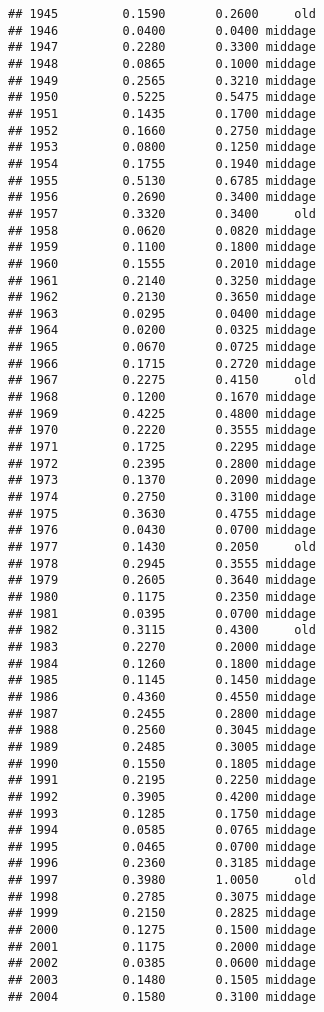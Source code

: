 \documentclass[
]{article}
\begin{document}
\begin{verbatim}
## 1945         0.1590       0.2600     old
## 1946         0.0400       0.0400 middage
## 1947         0.2280       0.3300 middage
## 1948         0.0865       0.1000 middage
## 1949         0.2565       0.3210 middage
## 1950         0.5225       0.5475 middage
## 1951         0.1435       0.1700 middage
## 1952         0.1660       0.2750 middage
## 1953         0.0800       0.1250 middage
## 1954         0.1755       0.1940 middage
## 1955         0.5130       0.6785 middage
## 1956         0.2690       0.3400 middage
## 1957         0.3320       0.3400     old
## 1958         0.0620       0.0820 middage
## 1959         0.1100       0.1800 middage
## 1960         0.1555       0.2010 middage
## 1961         0.2140       0.3250 middage
## 1962         0.2130       0.3650 middage
## 1963         0.0295       0.0400 middage
## 1964         0.0200       0.0325 middage
## 1965         0.0670       0.0725 middage
## 1966         0.1715       0.2720 middage
## 1967         0.2275       0.4150     old
## 1968         0.1200       0.1670 middage
## 1969         0.4225       0.4800 middage
## 1970         0.2220       0.3555 middage
## 1971         0.1725       0.2295 middage
## 1972         0.2395       0.2800 middage
## 1973         0.1370       0.2090 middage
## 1974         0.2750       0.3100 middage
## 1975         0.3630       0.4755 middage
## 1976         0.0430       0.0700 middage
## 1977         0.1430       0.2050     old
## 1978         0.2945       0.3555 middage
## 1979         0.2605       0.3640 middage
## 1980         0.1175       0.2350 middage
## 1981         0.0395       0.0700 middage
## 1982         0.3115       0.4300     old
## 1983         0.2270       0.2000 middage
## 1984         0.1260       0.1800 middage
## 1985         0.1145       0.1450 middage
## 1986         0.4360       0.4550 middage
## 1987         0.2455       0.2800 middage
## 1988         0.2560       0.3045 middage
## 1989         0.2485       0.3005 middage
## 1990         0.1550       0.1805 middage
## 1991         0.2195       0.2250 middage
## 1992         0.3905       0.4200 middage
## 1993         0.1285       0.1750 middage
## 1994         0.0585       0.0765 middage
## 1995         0.0465       0.0700 middage
## 1996         0.2360       0.3185 middage
## 1997         0.3980       1.0050     old
## 1998         0.2785       0.3075 middage
## 1999         0.2150       0.2825 middage
## 2000         0.1275       0.1500 middage
## 2001         0.1175       0.2000 middage
## 2002         0.0385       0.0600 middage
## 2003         0.1480       0.1505 middage
## 2004         0.1580       0.3100 middage

\end{verbatim}
\end{document}
